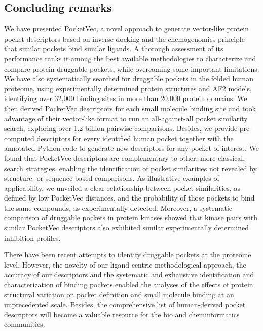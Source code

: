 \subsection{Concluding remarks}

We have presented PocketVec, a novel approach to generate vector-like protein pocket descriptors based on inverse docking and the chemogenomics principle that similar pockets bind similar ligands. A thorough assessment of its performance ranks it among the best available methodologies to characterize and compare protein druggable pockets, while overcoming some important limitations. We have also systematically searched for druggable pockets in the folded human proteome, using experimentally determined protein structures and AF2 models, identifying over 32,000 binding sites in more than 20,000 protein domains. We then derived PocketVec descriptors for each small molecule binding site and took advantage of their vector-like format to run an all-against-all pocket similarity search, exploring over 1.2 billion pairwise comparisons. Besides, we provide pre-computed descriptors for every identified human pocket together with the annotated Python code to generate new descriptors for any pocket of interest. We found that PocketVec descriptors are complementary to other, more classical, search strategies, enabling the identification of pocket similarities not revealed by structure- or sequence-based comparisons. As illustrative examples of applicability, we unveiled a clear relationship between pocket similarities, as defined by low PocketVec distances, and the probability of those pockets to bind the same compounds, as experimentally detected. Moreover, a systematic comparison of druggable pockets in protein kinases showed that kinase pairs with similar PocketVec descriptors also exhibited similar experimentally determined inhibition profiles. 

There have been recent attempts to identify druggable pockets at the proteome level\cite{wang_cavityspace_2022, konc_probis-fold_2022, sim_hproteome-bsite_2022, tsuchiya_possum_2023}. However, the novelty of our ligand-centric methodological approach, the accuracy of our descriptors and the systematic and exhaustive identification and characterization of binding pockets enabled the analyses of the effects of protein structural variation on pocket definition and small molecule binding at an unprecedented scale. Besides, the comprehensive list of human-derived pocket descriptors will become a valuable resource for the bio and cheminformatics communities.

